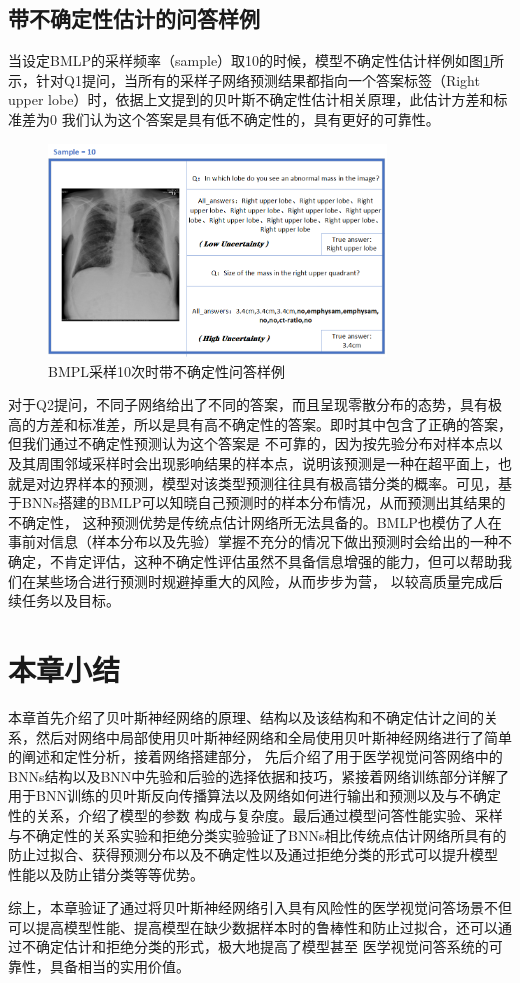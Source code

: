 \subsection{带不确定性估计的问答样例}
当设定BMLP的采样频率（sample）取10的时候，模型不确定性估计样例如图\ref{qademo}所示，针对Q1提问，当所有的采样子网络预测结果都指向一个答案标签（Right upper lobe）时，依据上文提到的贝叶斯不确定性估计相关原理\cite{blundell2015weight}，此估计方差和标准差为0
我们认为这个答案是具有低不确定性的，具有更好的可靠性。
\begin{figure}[htbp]
	\centering	
	\includegraphics[width=0.8\textwidth]{Fig/myfig/chapter4/qadamo.png}  %
	\caption{\label{qademo}BMPL采样10次时带不确定性问答样例} 
\end{figure}

对于Q2提问，不同子网络给出了不同的答案，而且呈现零散分布的态势，具有极高的方差和标准差，所以是具有高不确定性的答案。即时其中包含了正确的答案，但我们通过不确定性预测认为这个答案是
不可靠的，因为按先验分布对样本点以及其周围邻域采样时会出现影响结果的样本点，说明该预测是一种在超平面上，也就是对边界样本的预测，模型对该类型预测往往具有极高错分类的概率。可见，基于BNNs搭建的BMLP可以知晓自己预测时的样本分布情况，从而预测出其结果的不确定性，
这种预测优势是传统点估计网络所无法具备的。BMLP也模仿了人在事前对信息（样本分布以及先验）掌握不充分的情况下做出预测时会给出的一种不确定，不肯定评估，这种不确定性评估虽然不具备信息增强的能力，但可以帮助我们在某些场合进行预测时规避掉重大的风险，从而步步为营，
以较高质量完成后续任务以及目标。

\section{本章小结}
本章首先介绍了贝叶斯神经网络的原理、结构以及该结构和不确定估计之间的关系，然后对网络中局部使用贝叶斯神经网络和全局使用贝叶斯神经网络进行了简单的阐述和定性分析，接着网络搭建部分，
先后介绍了用于医学视觉问答网络中的BNNs结构以及BNN中先验和后验的选择依据和技巧，紧接着网络训练部分详解了用于BNN训练的贝叶斯反向传播算法以及网络如何进行输出和预测以及与不确定性的关系，介绍了模型的参数
构成与复杂度。最后通过模型问答性能实验、采样与不确定性的关系实验和拒绝分类实验验证了BNNs相比传统点估计网络所具有的防止过拟合、获得预测分布以及不确定性以及通过拒绝分类的形式可以提升模型
性能以及防止错分类等等优势。

综上，本章验证了通过将贝叶斯神经网络引入具有风险性的医学视觉问答场景不但可以提高模型性能、提高模型在缺少数据样本时的鲁棒性和防止过拟合，还可以通过不确定估计和拒绝分类的形式，极大地提高了模型甚至
医学视觉问答系统的可靠性，具备相当的实用价值。

